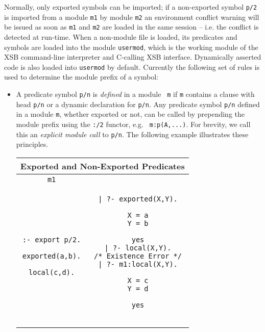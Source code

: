 Normally, only exported symbols can be imported; if a non-exported
symbol {\tt p/2} is imported from a module {\tt m1} by module {\tt m2}
an environment conflict warning will be issued as soon as {\tt m1} and
{\tt m2} are loaded in the same session -- i.e. the conflict is
detected at run-time.  When a non-module file is loaded, its
predicates and symbols are loaded into the module {\tt usermod}, which
is the working module of the XSB command-line interpreter and
C-calling XSB interface.  Dynamically asserted code is also loaded
into {\tt usermod} by default.
%
Currently the following set of rules is used to determine the module
prefix of a symbol:
\begin{itemize}
%
\item A predicate symbol {\tt p/n} is {\em defined} in a module {\tt
  m} if {\tt m} contains a clause with head {\tt p/n} or a dynamic
  declaration for {\tt p/n}.  Any predicate symbol {\tt p/n} defined
  in a module {\tt m}, whether exported or not, can be called by
  prepending the module prefix using the {\tt :/2} functor, e.g. {\tt
    m:p(A,...)}.  For brevity, we call this an {\em explicit module
    call} to {\tt p/n}.  The following example illustrates these
  principles.
%
\begin{center}
\begin{tabular}{cc}\hline \hline
\multicolumn{2}{c}{\rule{0ex}{2.5ex}\textbf{Exported and Non-Exported Predicates}} \\ \hline \hline
\rule[-2ex]{0ex}{5ex} \texttt{m1} &  \\
\begin{minipage}{18.5em}
\begin{verbatim}
:- export p/2.

exported(a,b).

local(c,d).

\end{verbatim}
\end{minipage}
&
\begin{minipage}{14.5em}
\begin{verbatim}
| ?- exported(X,Y).

X = a
Y = b

yes
| ?- local(X,Y).
/* Existence Error */
| ?- m1:local(X,Y).

X = c
Y = d

yes


\end{verbatim}
\end{minipage}
\end{tabular}
\end{center}
\end{itemize}
